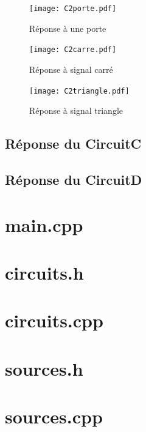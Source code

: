 \documentclass[a4paper,11pt]{article}
\begin{document}
      \begin{figure}[H]
	      \begin{center}
		\texttt{[image: C2porte.pdf]}
		\caption{Réponse à une porte}
	      \end{center}
	    \end{figure}

      \begin{figure}[H]
	      \begin{center}
		\texttt{[image: C2carre.pdf]}
		\caption{Réponse à signal carré}
	      \end{center}
	    \end{figure}

      \begin{figure}[H]
	      \begin{center}
		 \texttt{[image: C2triangle.pdf]}%
		\caption{Réponse à signal triangle}
	      \end{center}
	    \end{figure}
    
  \subsection{Réponse du CircuitC}
  \subsection{Réponse du CircuitD}

  \appendix
  \newpage
  \section{main.cpp}
    
    \newpage
  \section{circuits.h}
    
    \newpage
  \section{circuits.cpp}
    
    \newpage
   \section{sources.h}
    
    \newpage
   \section{sources.cpp}
    
    \newpage
\end{document}
